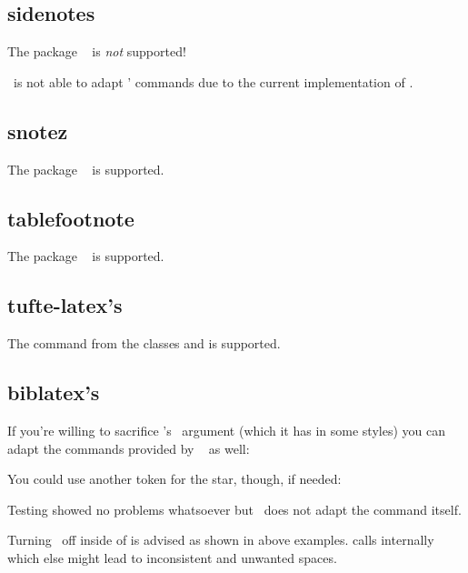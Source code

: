 \documentclass{fnpct-manual}
\begin{document}
\subsection{sidenotes}\label{sec:sidenotes}
\begin{bewareofthedog}
  The package ~\cite{pkg:sidenotes} is \emph{not} supported!
\end{bewareofthedog}
\fnpct\ is not able to adapt ' commands due to the current
implementation of .

\subsection{snotez}\label{sec:snotez}
The package ~\cite{pkg:snotez} is supported.

\subsection{tablefootnote}\label{sec:tablefootnote}
The package ~\cite{pkg:tablefootnote} is supported.

\subsection{tufte-latex's }\label{sec:tufte}
The  command from the  classes
 and  is supported.

\subsection{biblatex's }\label{sec:biblatex}
If you're willing to sacrifice 's \sarg\ argument (which it has
in some styles) you can adapt the commands provided by
~\cite{pkg:biblatex} as well:
You could use another token for the star, though, if needed:
\begin{sourcecode}
  \AdaptNote\footcite{t+oo+m}{%
\end{sourcecode}
Testing showed no problems whatsoever but \fnpct\ does not adapt the command
itself.

\begin{bewareofthedog}
  Turning \fnpct\ off inside of  is advised as shown in above
  examples.   calls  internally which else might
  lead to inconsistent and unwanted spaces.
\end{bewareofthedog}


\appendix

\printbibliography
\end{document}
